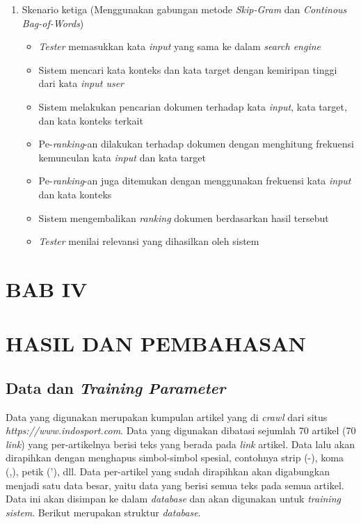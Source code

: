 \documentclass[12pt]{report}
\begin{document}
\begin{enumerate}
\item Skenario ketiga (Menggunakan gabungan metode \textit{Skip-Gram} dan \textit{Continous Bag-of-Words})
\begin{itemize}
\item \textit{Tester} memasukkan kata \textit{input} yang sama ke dalam \textit{search engine}
\item Sistem mencari kata konteks dan kata target dengan kemiripan tinggi dari kata \textit{input user}
\item Sistem melakukan pencarian dokumen terhadap kata \textit{input}, kata target, dan kata konteks terkait
\item Pe-\textit{ranking}-an dilakukan terhadap dokumen dengan menghitung frekuensi kemunculan kata \textit{input} dan kata target
\item Pe-\textit{ranking}-an juga ditemukan dengan menggunakan frekuensi kata \textit{input} dan kata konteks
\item Sistem mengembalikan \textit{ranking} dokumen berdasarkan hasil tersebut
\item \textit{Tester} menilai relevansi yang dihasilkan oleh sistem
\end{itemize}
\end{enumerate}


\newpage
\section[HASIL DAN PEMBAHASAN]{BAB IV}
\section*{HASIL DAN PEMBAHASAN}
\thispagestyle{plain}
\subsection{Data dan \textit{Training Parameter}}
Data yang digunakan merupakan kumpulan artikel yang di \textit{crawl} dari situs  \textit{https://www.indosport.com}. Data yang digunakan dibatasi sejumlah 70 artikel (70 \textit{link}) yang per-artikelnya berisi teks yang berada pada \textit{link} artikel. Data lalu akan dirapihkan dengan menghapus simbol-simbol spesial, contohnya strip (-), koma (,), petik ('), dll. Data per-artikel yang sudah dirapihkan akan digabungkan menjadi satu data besar, yaitu data yang berisi semua teks pada semua artikel. Data ini akan disimpan ke dalam \textit{database} dan akan digunakan untuk \textit{training sistem}. Berikut merupakan struktur \textit{database}.
\end{document}
